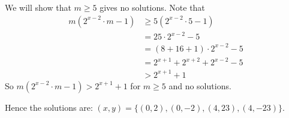 \begin{solution}
\begin{enumerate}
		We will show that $m \ge 5$ gives no solutions. Note that
		\begin{align*}
			m(2^{x - 2} \cdot m - 1)
				& \ge 5(2^{x - 2} \cdot 5 - 1) \\
				& = 25 \cdot 2^{x - 2} - 5 \\
				& = (8 + 16 + 1) \cdot 2^{x - 2} - 5  \\
				& = 2^{x + 1} + 2^{x + 2} + 2^{x - 2} - 5 \\
				& > 2^{x + 1} + 1
		\end{align*}
		So $m(2^{x - 2} \cdot m - 1) > 2^{x + 1} + 1$ for $m \ge 5$ and no solutions.
	\end{enumerate}
	Hence the solutions are: $(x,  y) = \{(0,  2), (0, -2), (4,  23),  (4, -23)\}$.
\end{solution}

%
